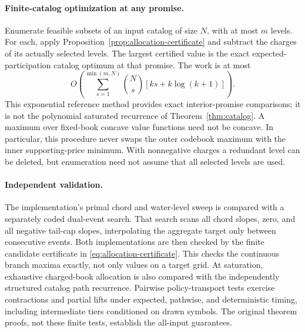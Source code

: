 \paragraph{Finite-catalog optimization at any promise.}
Enumerate feasible subsets of an input catalog of size $N$, with at most $m$ levels. For each, apply Proposition~\ref{prop:allocation-certificate} and subtract the charges of its actually selected levels. The largest certified value is the exact expected-participation catalog optimum at that promise. The work is at most
\[
 O\!\left(\sum_{s=1}^{\min(m,N)}\binom Ns[ks+k\log(k+1)]\right).
\]
This exponential reference method provides exact interior-promise comparisons; it is not the polynomial saturated recurrence of Theorem~\ref{thm:catalog}. A maximum over fixed-book concave value functions need not be concave. In particular, this procedure never swaps the outer codebook maximum with the inner supporting-price minimum. With nonnegative charges a redundant level can be deleted, but enumeration need not assume that all selected levels are used.

\paragraph{Independent validation.}
The implementation's primal chord and water-level sweep is compared with a separately coded dual-event search. That search scans all chord slopes, zero, and all negative tail-cap slopes, interpolating the aggregate target only between consecutive events. Both implementations are then checked by the finite candidate certificate in \eqref{eq:allocation-certificate}. This checks the continuous branch maxima exactly, not only values on a target grid. At saturation, exhaustive charged-book allocation is also compared with the independently structured catalog path recurrence. Pairwise policy-transport tests exercise contractions and partial lifts under expected, pathwise, and deterministic timing, including intermediate tiers conditioned on drawn symbols. The original theorem proofs, not these finite tests, establish the all-input guarantees.
